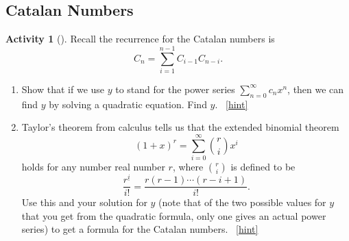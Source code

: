 \documentclass[10pt,]{book}
\theoremstyle{plain}
\theoremstyle{definition}
\theoremstyle{definition}
\theoremstyle{definition}
\newtheorem{activity}[project]{Activity}
\numberwithin{equation}{chapter}
\begin{document}
\subsection[{Catalan Numbers}]{Catalan Numbers}\label{subsection-28}
\begin{activity}[]\label{CatalanRecurrence}
\hypertarget{p-969}{}%
Recall the recurrence for the Catalan numbers is%
\begin{equation*}
C_n = \sum_{i=1}^{n-1} C_{i-1}C_{n-i}\text{.}
\end{equation*}
%
\begin{enumerate}[font=\bfseries,label=(\alph*),ref=\alph*]
\item\label{task-183} \hypertarget{p-970}{}%
Show that if we use \(y\) to stand for the power series \(\sum_{n=0}^\infty c_nx^n\), then we can find \(y\) by solving a quadratic equation. Find \(y\).%
~\hfill{\tiny\hyperlink{a-209.a}{[hint]}\hypertarget{q-209.a}{}}\item\label{task-184} \hypertarget{p-973}{}%
Taylor's theorem from calculus tells us that the extended binomial theorem%
\begin{equation*}
(1+x)^r = \sum_{i=0}^\infty \binom{r}{i}x^i
\end{equation*}
holds for any number real number \(r\), where \(\binom{r}{i}\) is defined to be%
\begin{equation*}
\frac{r^{\underline{i}}}{i!} = \frac{r(r-1)\cdots(r-i+1)}{i!}\text{.}
\end{equation*}
Use this and your solution for \(y\) (note that of the two possible values for \(y\) that you get from the quadratic formula, only one gives an actual power series) to get a formula for the Catalan numbers.%
~\hfill{\tiny\hyperlink{a-209.b}{[hint]}\hypertarget{q-209.b}{}}\end{enumerate}
\end{activity}
\typeout{************************************************}
\typeout{************************************************}
\end{document}
